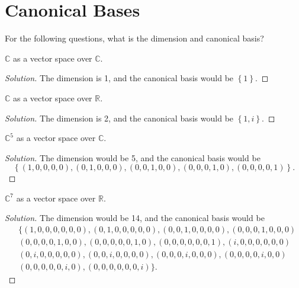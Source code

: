 \documentclass{article}
\newenvironment{solution}{\begin{proof}[Solution]}{\end{proof}}
\newcommand{\CC}{\mathbb{C}}
\newcommand{\RR}{\mathbb{R}}
\begin{document}
	\newpage
	
	\section{Canonical Bases}
	For the following questions, what is the dimension and canonical basis?
	\begin{hw}
		$\CC$ as a vector space over $\CC$.
	\end{hw}
	\begin{solution}
		The dimension is 1, and the canonical basis would be $\left\{  1 \right\}$.
	\end{solution}

	\begin{hw}
		$\CC$ as a vector space over $\RR$.
	\end{hw}
	\begin{solution}
		The dimension is 2, and the canonical basis would be $\left\{  1, i \right\}$.
	\end{solution}

	\begin{hw}
		$\CC^{5}$ as a vector space over $\CC$.
	\end{hw}
	\begin{solution}
		The dimension would be 5, and the canonical basis would be
		\begin{equation*}
			\left\{  (1,0,0,0,0), (0,1,0,0,0), (0,0,1,0,0), (0,0,0,1,0), (0,0,0,0,1) \right\}.
		\end{equation*}
	\end{solution}

	\begin{hw}
		$\CC^{7}$ as a vector space over $\RR$.
	\end{hw}
	\begin{solution}
		The dimension would be 14, and the canonical basis would be
		\begin{align*}
			&\{(1,0,0,0,0,0,0), (0,1,0,0,0,0,0), (0,0,1,0,0,0,0), (0,0,0,1,0,0,0) \\
			&(0,0,0,0,1,0,0), (0,0,0,0,0,1,0), (0,0,0,0,0,0,1), (i,0,0,0,0,0,0) \\
			&(0,i,0,0,0,0,0), (0,0,i,0,0,0,0), (0,0,0,i,0,0,0), (0,0,0,0,i,0,0) \\
			&(0,0,0,0,0,i,0), (0,0,0,0,0,0,i)\}.
		\end{align*}
	\end{solution}

	\newpage
	
\end{document}
